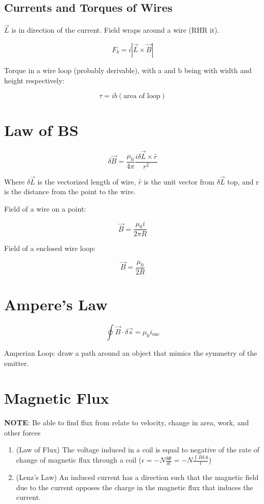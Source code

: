 \documentclass{article}
\begin{document}
\subsection{Currents and Torques of Wires}

$\vec{L}$ is in direction of the current. Field wraps around a wire (RHR it).

$$F_b = i |\vec{L} \times \vec{B} |$$

Torque in a wire loop (probably derivable), with a and b being with width and height respectively:

$$\tau = ib (\text{area of loop})$$

\section{Law of BS}

$$\delta \vec{B} = \frac{\mu_0}{4\pi} \frac{i \delta \vec{L} \times \hat{r}}{r^2}$$

Where $\delta \vec{L}$ is the vectorized length of wire, $\hat{r}$ is the unit vector from $\delta \vec{L}$ top, and r is the distance from the point to the wire.

Field of a wire on a point:

$$\vec{B} = \frac{\mu_0 i}{2 \pi R}$$

Field of a enclosed wire loop:

$$\vec{B} = \frac{\mu_0}{2R}$$

\section{Ampere's Law}

$$\oint \vec{B} \cdot \delta \vec{s} = \mu_0 i_{\text{enc}}$$

Amperian Loop: draw a path around an object that mimics the symmetry of the emitter.

\section{Magnetic Flux}

\textbf{NOTE}: Be able to find flux from relate to velocity, change in area, work, and other forces

\begin{enumerate}
    \item (Law of Flux) The voltage induced in a coil is equal to negative of the rate of change of magnetic flux through a coil ($\epsilon = - N\frac{\delta \Phi}{\delta t} = -N\frac{\int B \delta A}{t}$)
    \item (Lenz's Law) An induced current has a direction such that the magnetic field due to the current opposes the charge in the magnetic  flux that induces the current.
\end{enumerate}
\end{document}

